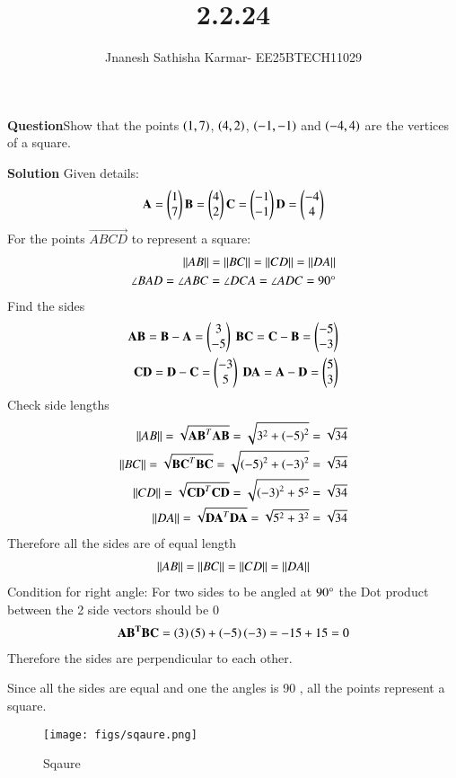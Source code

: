 \documentclass[journal]{IEEEtran}
\theoremstyle{remark}
\begin{document}

\onecolumn

\title{2.2.24}
\author{Jnanesh Sathisha Karmar- EE25BTECH11029}
\maketitle


\renewcommand{\thefigure}{\theenumi}
\renewcommand{\thetable}{\theenumi}
\textbf{Question}Show that the points $\left(1, 7\right)$, $\left(4, 2\right)$, $\left(-1, -1\right)$ and $\left(-4, 4\right)$ are the vertices of a square.

\textbf{Solution}
Given details:
\begin{align}
    \mathbf{A}=\begin{pmatrix}1\\7\end{pmatrix}  \mathbf{B}=\begin{pmatrix}4\\2\end{pmatrix} \mathbf{C}=\begin{pmatrix}-1\\-1\end{pmatrix} \mathbf{D}=\begin{pmatrix}-4\\4\end{pmatrix}
\end{align}
For the points $\vec{ABCD}$ to represent a square:
\begin{align}
    \left\lVert AB\right\rVert=\left\lVert BC\right\rVert=\left\lVert CD\right\rVert=\left\lVert DA\right\rVert\\
    \angle{BAD}=\angle{ABC}=\angle{DCA}=\angle{ADC}=90\degree{}
\end{align}
Find the sides
\begin{align}
\vec{AB}=\vec{B}-\vec{A}=\myvec{3\\-5} \  \vec{BC}=\vec{C}-\vec{B}=\myvec{-5\\-3} \\
\vec{CD}=\vec{D}-\vec{C}=\myvec{-3\\5} \ 
\vec{DA}=\vec{A}-\vec{D}=\myvec{5\\3}
\end{align}
Check side lengths
\begin{align}
    \left\lVert AB\right\rVert=\sqrt{\mathbf{AB}^T\mathbf{AB}}=\sqrt{3^2+\left(-5\right)^2}=\sqrt{34}\\
    \left\lVert BC\right\rVert=\sqrt{\mathbf{BC}^T\mathbf{BC}}=\sqrt{\left(-5\right)^2+\left(-3\right)^2}=\sqrt{34}\\
    \left\lVert CD\right\rVert=\sqrt{\mathbf{CD}^T\mathbf{CD}}=\sqrt{\left(-3\right)^2+5^2}=\sqrt{34}\\
    \left\lVert DA\right\rVert=\sqrt{\mathbf{DA}^T\mathbf{DA}}=\sqrt{5^2+3^2}=\sqrt{34}
\end{align}
Therefore all the sides are of equal length
\begin{align}
    \left\lVert AB\right\rVert=\left\lVert BC\right\rVert=\left\lVert CD\right\rVert=\left\lVert DA\right\rVert
\end{align}
Condition for right angle:
For two sides to be angled at $90\degree{}$ the Dot product between the 2 side vectors should be 0
\begin{align}
    \mathbf{AB^TBC}=\left(3\right)\left(5\right)+\left(-5\right)\left(-3\right)=-15+15=0
\end{align}
Therefore the sides are perpendicular to each other.

Since all the sides are equal and one the angles is 90\degree{} , all the points represent a square.
\begin{figure}[H]
    \centering
    \texttt{[image: figs/sqaure.png]}
    \caption{Sqaure}
    \label{fig:placeholder_1}
\end{figure}
\end{document}
